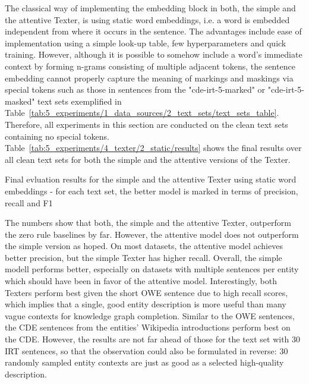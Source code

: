 The classical way of implementing the embedding block in both, the simple and the attentive Texter, is using static word embeddings, i.e. a word is embedded independent from where it occurs in the sentence. The advantages include ease of implementation using a simple look-up table, few hyperparameters and quick training. However, although it is possible to somehow include a word's immediate context by forming n-grams consisting of multiple adjacent tokens, the sentence embedding cannot properly capture the meaning of markings and maskings via special tokens such as those in sentences from the "cde-irt-5-marked" or "cde-irt-5-masked" text sets exemplified in Table~\ref{tab:5_experiments/1_data_sources/2_text_sets/text_sets_table}. Therefore, all experiments in this section are conducted on the clean text sets containing no special tokens. Table~\ref{tab:5_experiments/4_texter/2_static/results} shows the final results over all clean text sets for both the simple and the attentive versions of the Texter.

\begin{table}[h]
    \centering
    
    \caption{Final evluation results for the simple and the attentive Texter using static word embeddings - for each text set, the better model is marked in terms of precision, recall and F1}
    \label{tab:5_experiments/4_texter/2_static/results}
\end{table}

The numbers show that both, the simple and the attentive Texter, outperform the zero rule baselines by far. However, the attentive model does not outperform the simple version as hoped. On most datasets, the attentive model achieves better precision, but the simple Texter has higher recall. Overall, the simple modell performs better, especially on datasets with multiple sentences per entity which should have been in favor of the attentive model. Interestingly, both Texters perform best given the short OWE sentence due to high recall scores, which implies that a single, good entity description is more useful than many vague contexts for knowledge graph completion. Similar to the OWE sentences, the CDE sentences from the entities' Wikipedia introductions perform best on the CDE. However, the results are not far ahead of those for the text set with 30 IRT sentences, so that the observation could also be formulated in reverse: 30 randomly sampled entity contexts are just as good as a selected high-quality description.

